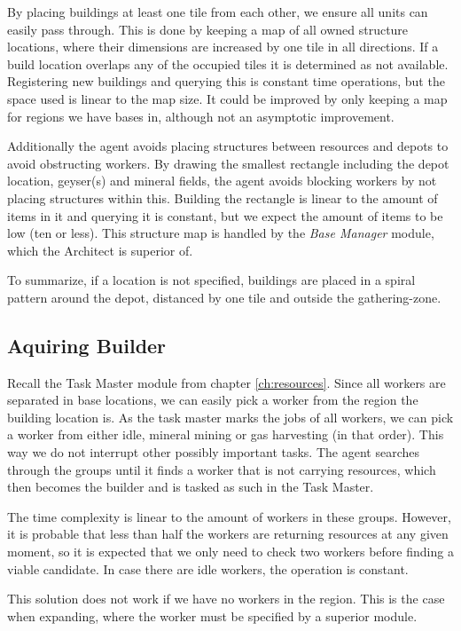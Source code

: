 	By placing buildings at least one tile from each other, we ensure all units can easily pass through. This is done by keeping a map of all owned structure locations, where their dimensions are increased by one tile in all directions. If a build location overlaps any of the occupied tiles it is determined as not available. Registering new buildings and querying this is constant time operations, but the space used is linear to the map size. It could be improved by only keeping a map for regions we have bases in, although not an asymptotic improvement.
	
	Additionally the agent avoids placing structures between resources and depots to avoid obstructing workers. By drawing the smallest rectangle including the depot location, geyser(s) and mineral fields, the agent avoids blocking workers by not placing structures within this. Building the rectangle is linear to the amount of items in it and querying it is constant, but we expect the amount of items to be low (ten or less). This structure map is handled by the \emph{Base Manager} module, which the Architect is superior of.
	
	To summarize, if a location is not specified, buildings are placed in a spiral pattern around the depot, distanced by one tile and outside the gathering-zone.

	\subsection*{Aquiring Builder}
	Recall the Task Master module from chapter \ref{ch:resources}. Since all workers are separated in base locations, we can easily pick a worker from the region the building location is. As the task master marks the jobs of all workers, we can pick a worker from either idle, mineral mining or gas harvesting (in that order). This way we do not interrupt other possibly important tasks. The agent searches through the groups until it finds a worker that is not carrying resources, which then becomes the builder and is tasked as such in the Task Master.
	
	The time complexity is linear to the amount of workers in these groups. However, it is probable that less than half the workers are returning resources at any given moment, so it is expected that we only need to check two workers before finding a viable candidate. In case there are idle workers, the operation is constant.
	
	This solution does not work if we have no workers in the region. This is the case when expanding, where the worker must be specified by a superior module.
	
